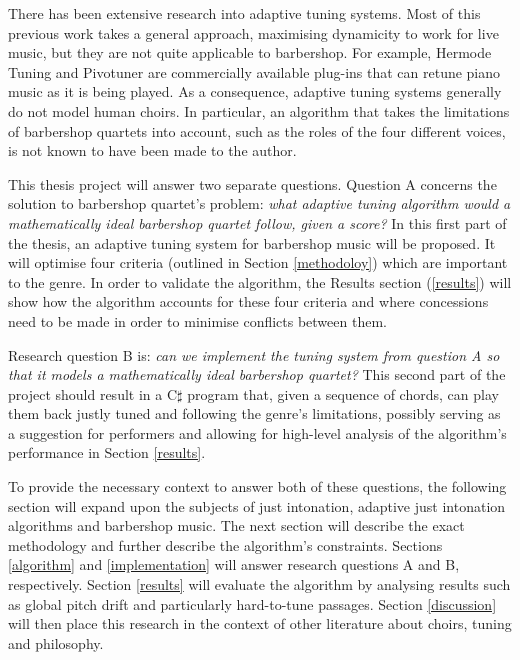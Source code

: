 \documentclass[a4paper]{article}
\begin{document}
There has been extensive research into adaptive tuning systems. \cite{sethares_adaptive_2005} Most of this previous work takes a general approach, maximising dynamicity to work for live music, but they are not quite applicable to barbershop. For example, Hermode Tuning \cite{mohrlok_hermode_2003} and Pivotuner \cite{volkov_pivotuner_2022} are commercially available plug-ins that can retune piano music as it is being played. As a consequence, adaptive tuning systems generally do not model human choirs. In particular, an algorithm that takes the limitations of barbershop quartets into account, such as the roles of the four different voices, is not known to have been made to the author.

This thesis project will answer two separate questions. Question A concerns the solution to barbershop quartet's problem: {\it what adaptive tuning algorithm would a mathematically ideal barbershop quartet follow, given a score?} In this first part of the thesis, an adaptive tuning system for barbershop music will be proposed. It will optimise four criteria (outlined in Section \ref{methodoloy}) which are important to the genre. In order to validate the algorithm, the Results section (\ref{results}) will show how the algorithm accounts for these four criteria and where concessions need to be made in order to minimise conflicts between them.

Research question B is: {\it can we implement the tuning system from question A so that it models a mathematically ideal barbershop quartet?} This second part of the project should result in a C$\sharp$ program that, given a sequence of chords, can play them back justly tuned and following the genre's limitations, possibly serving as a suggestion for performers and allowing for high-level analysis of the algorithm's performance in Section \ref{results}.

To provide the necessary context to answer both of these questions, the following section will expand upon the subjects of just intonation, adaptive just intonation algorithms and barbershop music. The next section will describe the exact methodology and further describe the algorithm's constraints. Sections \ref{algorithm} and \ref{implementation} will answer research questions A and B, respectively. Section \ref{results} will evaluate the algorithm by analysing results such as global pitch drift and particularly hard-to-tune passages. Section \ref{discussion} will then place this research in the context of other literature about choirs, tuning and philosophy.
\end{document}
